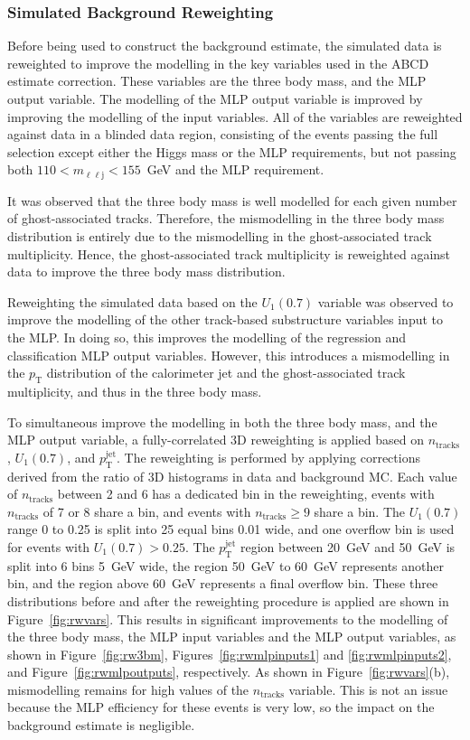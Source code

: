 \documentclass[NOTE, atlasdraft=true, texlive=2017, UKenglish]{\ATLASLATEXPATH atlasdoc}
\begin{document}
\subsubsection{Simulated Background Reweighting}
\label{sec:bkgdrw}

Before being used to construct the background estimate, the simulated data is reweighted to improve the modelling in the key variables used in the ABCD estimate correction. These variables are the three body mass, and the MLP output variable. The modelling of the MLP output variable is improved by improving the modelling of the input variables. All of the variables are reweighted against data in a blinded data region, consisting of the events passing the full selection except either the Higgs mass or the MLP requirements, but not passing both $110<m_{\ell\ell\text{j}}<155$~GeV and the MLP requirement.

It was observed that the three body mass is well modelled for each given number of ghost-associated tracks. Therefore, the mismodelling in the three body mass distribution is entirely due to the mismodelling in the ghost-associated track multiplicity. Hence, the ghost-associated track multiplicity is reweighted against data to improve the three body mass distribution.

Reweighting the simulated data based on the $U_1(0.7)$ variable was observed to improve the modelling of the other track-based substructure variables input to the MLP. In doing so, this improves the modelling of the regression and classification MLP output variables. However, this introduces a mismodelling in the $p_\text{T}$ distribution of the calorimeter jet and the ghost-associated track multiplicity, and thus in the three body mass.

To simultaneous improve the modelling in both the three body mass, and the MLP output variable, a fully-correlated 3D reweighting is applied based on $n_\text{tracks}$, $U_1(0.7)$, and $p_\text{T}^\text{jet}$. The reweighting is performed by applying corrections derived from the ratio of 3D histograms in data and background MC. Each value of $n_\text{tracks}$ between 2 and 6 has a dedicated bin in the reweighting, events with $n_\text{tracks}$ of 7 or 8 share a bin, and events with $n_\text{tracks}\geq 9$ share a bin. The $U_1(0.7)$ range 0 to 0.25 is split into 25 equal bins 0.01 wide, and one overflow bin is used for events with $U_1(0.7)>0.25$. The $p_\text{T}^\text{jet}$ region between 20~GeV and 50~GeV is split into 6 bins 5~GeV wide, the region 50~GeV to 60~GeV represents another bin, and the region above 60~GeV represents a final overflow bin. These three distributions before and after the reweighting procedure is applied are shown in Figure~\ref{fig:rwvars}. This results in significant improvements to the modelling of the three body mass, the MLP input variables and the MLP output variables, as shown in Figure~\ref{fig:rw3bm}, Figures~\ref{fig:rwmlpinputs1} and \ref{fig:rwmlpinputs2}, and Figure~\ref{fig:rwmlpoutputs}, respectively. As shown in Figure~\ref{fig:rwvars}(b), mismodelling remains for high values of the $n_\text{tracks}$ variable. This is not an issue because the MLP efficiency for these events is very low, so the impact on the background estimate is negligible.
\end{document}
